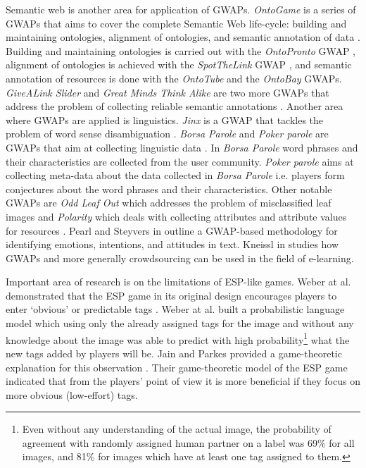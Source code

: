 Semantic web is another area for application of GWAPs. \textit{OntoGame} is a series of GWAPs that aims to cover the complete Semantic Web life-cycle: building and maintaining ontologies, alignment of ontologies, and semantic annotation of data \cite{Siorpaes:2008:GPS:1373102.1373155}. Building and maintaining ontologies is carried out with the \textit{OntoPronto} GWAP \cite{thaler2012experiment}, alignment of ontologies is achieved with the \textit{SpotTheLink} GWAP \cite{DBLP:conf/wm/ThalerSS11}, and semantic annotation of resources is done with the \textit{OntoTube} and the \textit{OntoBay} GWAPs. \textit{GiveALink Slider} and \textit{Great Minds Think Alike} are two more GWAPs that address the problem of collecting reliable semantic annotations \cite{Weng11cgames}. Another area where GWAPs are applied is linguistics. \textit{Jinx} is a GWAP that tackles the problem of word sense disambiguation \cite{Seemakurty:2010:WSD:1837885.1837905}. \textit{Borsa Parole} and \textit{Poker parole} are GWAPs that aim at collecting linguistic data \cite{PMS-FB-2013-4}. In \textit{Borsa Parole} word phrases and their characteristics are collected from the user community. \textit{Poker parole} aims at collecting meta-data about the data collected in \textit{Borsa Parole} i.e. players form conjectures about the word phrases and their characteristics. Other notable GWAPs are \textit{Odd Leaf Out} which addresses the problem of misclassified leaf images \cite{DBLP:conf/socialcom/HansenJLBPRS11} and \textit{Polarity} which deals with collecting attributes and attribute values for resources \cite{law.cvpr11ws}. Pearl and Steyvers in \cite{Pearl:2010:IEI:1860631.1860640} outline a GWAP-based methodology for identifying emotions, intentions, and attitudes in text. Kneissl in \cite{ediss16841} studies how GWAPs and more generally crowdsourcing can be used in the field of e-learning.

Important area of research is on the limitations of ESP-like games. Weber at al. demonstrated that the ESP game in its original design encourages players to enter `obvious' or predictable tags \cite{DBLP:conf/chi/RobertsonVW09}. Weber at al. built a probabilistic language model which using only the already assigned tags for the image and without any knowledge about the image was able to predict with high probability\footnote{Even without any understanding  of  the  actual  image,  the  probability of agreement with randomly assigned human partner on a label was 69\% for all images, and 81\% for images which have at least one tag assigned to them.} what the new tags added by players will be. Jain and Parkes provided a game-theoretic explanation for this observation \cite{Jain:2013:GAE:2399187.2399190}. Their game-theoretic model of the ESP game indicated that from the players' point of view it is more beneficial if they focus on more obvious (low-effort) tags.

